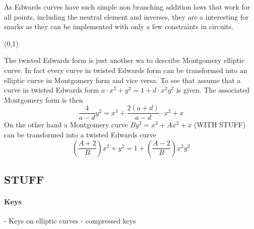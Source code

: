 As Edwards curves have such simple non branching addition laws that work for all points, including the neutral element and inverses, they are a interesting for snarks as they can be implemented with only a few constraints in circuits.

(0,1)


The twisted Edwards form is just another wa to describe Montgomery elliptic curve. In fact every curve in twisted Edwards form can be transformed into an elliptic curve in Montgomery form and vice versa. To see that assume that a curve in twisted Edwards form $a\cdot x^2+y^2= 1+d\cdot x^2y^2$ is given. The associated Montgomery form is then
$$
\frac{4}{a-d} y^2 = x^3 + \frac{2(a+d)}{a-d}\cdot x^2 + x 
$$
On the other hand a Montgomery curve $By^{2}=x^{3}+Ax^{2}+x$ (WITH STUFF) can be transformed into a twisted Edwards curve 
$$
(\frac{A+2}{B})x^2+y^2= 1+(\frac{A-2}{B})x^2y^2
$$

\subsection{STUFF}



\paragraph{Keys}
- Keys on elliptic curves
- compressed keys




